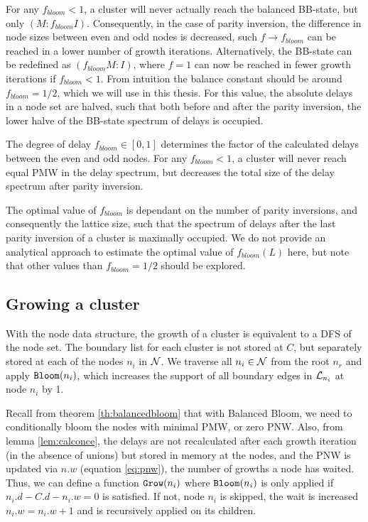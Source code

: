 For any $f_{bloom} < 1$, a cluster will never actually reach the balanced BB-state, but only $(M:f_{bloom}I)$. Consequently, in the case of parity inversion, the difference in node sizes between even and odd nodes is decreased, such $f\to f_{bloom}$ can be reached in a lower number of growth iterations. Alternatively, the BB-state can be redefined as $(f_{bloom}M:I)$, where $f=1$ can now be reached in fewer growth iterations if $f_{bloom} <1$.  From intuition the balance constant should be around $f_{bloom} = 1/2$, which we will use in this thesis. For this value, the absolute delays in a node set are halved, such that both before and after the parity inversion, the lower halve of the BB-state spectrum of delays is occupied.
\begin{theorem}
  The degree of delay $f_{bloom} \in [0, 1]$ determines the factor of the calculated delays between the even and odd nodes. For any $f_{bloom} < 1$, a cluster will never reach equal PMW in the delay spectrum, but decreases the total size of the delay spectrum after parity inversion.
\end{theorem}

The optimal value of $f_{bloom}$ is dependant on the number of parity inversions, and consequently the lattice size, such that the spectrum of delays after the last parity inversion of a cluster is maximally occupied. We do not provide an analytical approach to estimate the optimal value of $f_{bloom}(L)$ here, but note that other values than $f_{bloom} = 1/2$ should be explored. \\

\subsection{Growing a cluster}\label{sec:growingcluster}

With the node data structure, the growth of a cluster is equivalent to a DFS of the node set. The boundary list for each cluster is not stored at $C$, but separately stored at each of the nodes $n_i$ in $\mathcal{N}$. We traverse all $n_i \in \mathcal{N}$ from the root $n_r$ and apply $\texttt{Bloom}(n_i)$, which increases the support of all boundary edges in $\mathcal{L}_{n_i}$ at node $n_i$ by 1.

Recall from theorem \ref{th:balancedbloom} that with Balanced Bloom, we need to conditionally bloom the nodes with minimal PMW, or zero PNW. Also, from lemma \ref{lem:calconce}, the delays are not recalculated after each growth iteration (in the absence of unions) but stored in memory at the nodes, and the PNW is updated via $n.w$ (equation \ref{eq:pnw}), the number of growths a node has waited. Thus, we can define a function $\texttt{Grow}(n_i)$ where $\texttt{Bloom}(n_i)$ is only applied if $n_i.d - C.d - n_i.w = 0$ is satisfied. If not, node $n_i$ is skipped, the wait is increased $n_i.w = n_i.w +1$ and  is recursively applied on its children.

